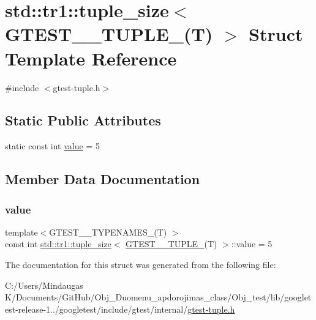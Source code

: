 \hypertarget{structstd_1_1tr1_1_1tuple__size_3_01_g_t_e_s_t__5___t_u_p_l_e___07_t_08_01_4}{}\section{std\+::tr1\+::tuple\+\_\+size$<$ G\+T\+E\+S\+T\+\_\+\_\+\+T\+U\+P\+L\+E\+\_\+(T) $>$ Struct Template Reference}
\label{structstd_1_1tr1_1_1tuple__size_3_01_g_t_e_s_t__5___t_u_p_l_e___07_t_08_01_4}


{\ttfamily \#include $<$gtest-\/tuple.\+h$>$}

\subsection*{Static Public Attributes}
\begin{DoxyCompactItemize}
\item 
static const int \mbox{\hyperlink{structstd_1_1tr1_1_1tuple__size_3_01_g_t_e_s_t__5___t_u_p_l_e___07_t_08_01_4_a83d207f8b8e95d9b747a586550feefcb}{value}} = 5
\end{DoxyCompactItemize}


\subsection{Member Data Documentation}
\mbox{\label{structstd_1_1tr1_1_1tuple__size_3_01_g_t_e_s_t__5___t_u_p_l_e___07_t_08_01_4_a83d207f8b8e95d9b747a586550feefcb}} 
\subsubsection{\texorpdfstring{value}{value}}
{\footnotesize\ttfamily template$<$G\+T\+E\+S\+T\+\_\+\_\+\+T\+Y\+P\+E\+N\+A\+M\+E\+S\+\_\+(\+T) $>$ \\
const int \mbox{\hyperlink{structstd_1_1tr1_1_1tuple__size}{std\+::tr1\+::tuple\+\_\+size}}$<$ \mbox{\hyperlink{namespacestd_1_1tr1_a51b070e2eb5e6bb83a290f35c19667dd}{G\+T\+E\+S\+T\+\_\+\_\+\+T\+U\+P\+L\+E\+\_\+}}(T) $>$\+::value = 5\hspace{0.3cm}{\ttfamily [static]}}



The documentation for this struct was generated from the following file\+:\begin{DoxyCompactItemize}
\item 
C\+:/\+Users/\+Mindaugas K/\+Documents/\+Git\+Hub/\+Obj\+\_\+\+Duomenu\+\_\+apdorojimas\+\_\+class/\+Obj\+\_\+test/lib/googletest-\/release-\/1../googletest/include/gtest/internal/\mbox{\hyperlink{gtest-tuple_8h}{gtest-\/tuple.\+h}}\end{DoxyCompactItemize}
